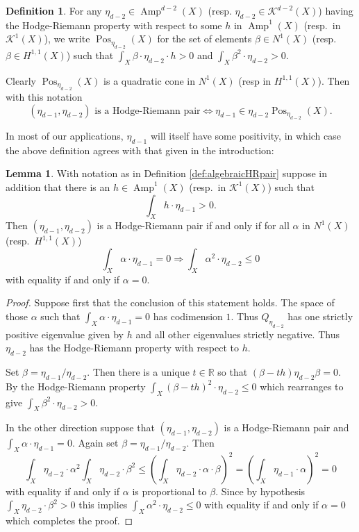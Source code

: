 \documentclass[a4,reqno]{amsart}
\theoremstyle{definition}
\newtheorem{definition}[theorem]{Definition}
\newtheorem{lemma}[theorem]{Lemma}
\def\cK{\mathcal K}
\DeclareMathOperator{\Amp}{Amp}
\DeclareMathOperator{\Pos}{Pos}
\numberwithin{equation}{section}
\begin{document}
\begin{definition}
For any $\eta_{d-2}\in \Amp^{d-2}(X)$ (resp.  $\eta_{d-2}\in \cK^{d-2}(X)$) having the Hodge-Riemann property with respect to some $h$ in $\Amp^1(X)$ (resp.\ in $\cK^1(X)$), we write 
$\Pos_{\eta_{d-2}}(X)$ for the set of elements $\beta\in N^{1}(X)$ (resp. $\beta\in H^{1,1}(X)$) such that $\int_X \beta \cdot \eta_{d-2} \cdot h >0$ and $ \int_X \beta^2 \cdot \eta_{d-2}>0$.
\end{definition}

Clearly $\Pos_{\eta_{d-2}}(X)$ is a quadratic cone in $N^{1}(X)$ (resp in $ H^{1,1}(X)$). Then with this notation 
$$(\eta_{d-1},\eta_{d-2})\text{ is a Hodge-Riemann pair} \Longleftrightarrow \eta_{d-1}\in\eta_{d-2}\Pos_{\eta_{d-2}}(X).$$


In most of our applications, $\eta_{d-1}$ will itself have some positivity, in which case the above definition agrees with that given in the introduction:


\begin{lemma}\label{lem:equivalentHRpairforpositive}
With notation as in Definition \ref{def:algebraicHRpair} suppose in addition that there is an $h\in \Amp^1(X)$ (resp.\ in $\cK^1(X)$) such that  $$\int_X h\cdot \eta_{d-1}>0.$$
Then $(\eta_{d-1},\eta_{d-2})$ is a Hodge-Riemann pair if and only if for all $\alpha$ in $N^1(X)$ (resp.\ $H^{1,1}(X)$)
$$\int_X \alpha \cdot \eta_{d-1} =0 \Rightarrow \int_X \alpha^2 \cdot \eta_{d-2}\le 0$$
with equality if and only if $\alpha=0$.
\end{lemma}
\begin{proof}
Suppose first that the conclusion of this statement holds. The space of those $\alpha$ such that $\int_X \alpha\cdot \eta_{d-1}=0$ has codimension $1$.  Thus $Q_{\eta_{d-2}}$ has one strictly positive eigenvalue given by $h$ and all other eigenvalues strictly negative.  Thus $\eta_{d-2}$ has the Hodge-Riemann property with respect to $h$.


Set $\beta = \eta_{d-1}/\eta_{d-2}$.  Then there is a unique $t\in \mathbb R$ so that $(\beta - th)\eta_{d-2}\beta=0$.  By the Hodge-Riemann property $\int_X (\beta-th)^2\cdot \eta_{d-2}\le 0$ which rearranges to give $\int_X \beta^2 \cdot \eta_{d-2} >0$.

In the other direction suppose that $(\eta_{d-1},\eta_{d-2})$ is a Hodge-Riemann pair and $\int_X \alpha\cdot \eta_{d-1}=0$.  Again set $\beta = \eta_{d-1}/\eta_{d-2}$.  Then
$$\int_X \eta_{d-2}\cdot \alpha^2 \int_X \eta_{d-2} \cdot \beta^2 \le \left(\int_X \eta_{d-2}\cdot \alpha\cdot \beta \right)^2= \left(\int_X \eta_{d-1}\cdot \alpha\right)^2 =0$$
with equality if and only if $\alpha$ is proportional to $\beta$.  Since by hypothesis $\int_X \eta_{d-2}\cdot \beta^2>0$ this implies $\int_X\alpha^2 \cdot \eta_{d-2}\le 0$ with equality if and only if $\alpha=0$ which completes the proof.
\end{proof}
\end{document}
